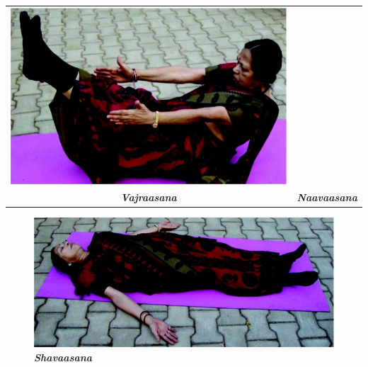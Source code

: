 \begin{center}
\begin{tabular}{@{}cc@{}}
\includegraphics[scale=1]{images/093.jpg}\\
{\textbf{\textit{Vajraasana}}} &
{\textbf{\textit{Naavaasana}}}\\
\end{tabular}
\end{center}

\clearpage

\begin{figure}[h]
\centering
\includegraphics[scale=1.8]{images/094.jpg}\\
\textbf{\textit{Shavaasana}}
\end{figure}



